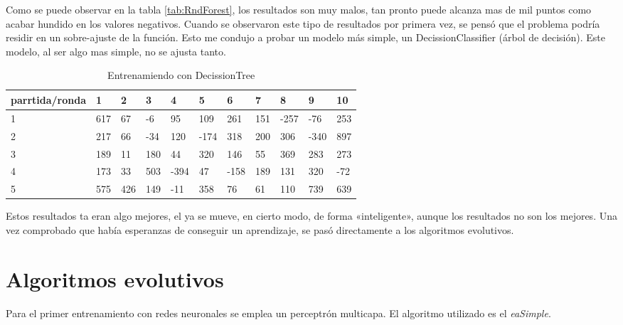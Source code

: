 Como se puede observar en la tabla \ref{tab:RndForest}, los resultados son muy malos, tan pronto puede alcanza mas de mil puntos como acabar hundido en los valores negativos. Cuando se observaron este tipo de resultados por primera vez, se pensó que el problema podría residir en un sobre-ajuste de la función. Esto me condujo a probar un modelo más simple, un DecissionClassifier (árbol de decisión). Este modelo, al ser algo mas simple, no se ajusta tanto.


\begin{table}[h!]
\centering
\begin{tabular}{|l|l|l|l|l|l|l|l|l|l|l|}
\hline
\rowcolor[HTML]{C0C0C0} 
parrtida/ronda & 1   & 2   & 3   & 4    & 5    & 6    & 7   & 8    & 9    & 10  \\ \hline
1              & 617 & 67  & -6  & 95   & 109  & 261  & 151 & -257 & -76  & 253 \\ \hline
\rowcolor[HTML]{EFEFEF} 
2              & 217 & 66  & -34 & 120  & -174 & 318  & 200 & 306  & -340 & 897 \\ \hline
3              & 189 & 11  & 180 & 44   & 320  & 146  & 55  & 369  & 283  & 273 \\ \hline
\rowcolor[HTML]{EFEFEF} 
4              & 173 & 33  & 503 & -394 & 47   & -158 & 189 & 131  & 320  & -72 \\ \hline
5              & 575 & 426 & 149 & -11  & 358  & 76   & 61  & 110  & 739  & 639 \\ \hline
\end{tabular}
\caption{Entrenamiendo con DecissionTree}
\label{my-label}
\end{table}



Estos resultados ta eran algo mejores, el ya se mueve, en cierto modo, de forma «inteligente», aunque los resultados no son los mejores. Una vez comprobado que había esperanzas de conseguir un aprendizaje, se pasó directamente a los algoritmos evolutivos.


\section{Algoritmos evolutivos}

Para el primer entrenamiento con redes neuronales se emplea un perceptrón multicapa. El algoritmo utilizado es el \emph{eaSimple}.

